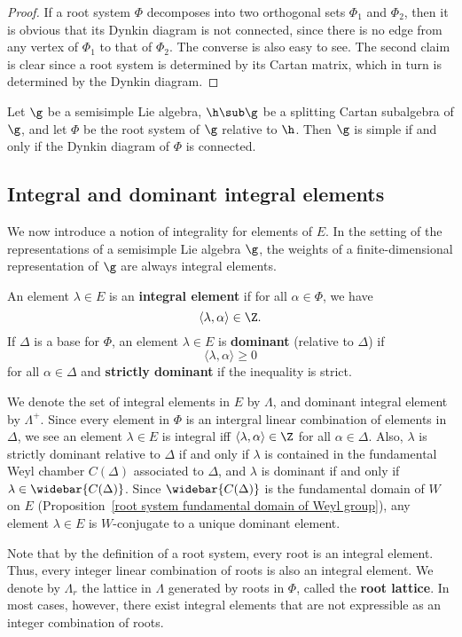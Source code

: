 \begin{proof}
If a root system $\Phi$ decomposes into two orthogonal sets $\Phi_1$ and $\Phi_2$, then it is obvious that its Dynkin diagram is not connected, since there is no edge from any vertex of $\Phi_1$ to that of $\Phi_2$. The converse is also easy to see. The second claim is clear since a root system is determined by its Cartan matrix, which in turn is determined by the Dynkin diagram.
\end{proof}
\begin{corollary}
Let $\g$ be a semisimple Lie algebra, $\h\sub\g$ be a splitting Cartan subalgebra of $\g$, and let $\Phi$ be the root system of $\g$ relative to $\h$. Then $\g$ is simple if and only if the Dynkin diagram of $\Phi$ is connected.
\end{corollary} 
\subsection{Integral and dominant integral elements}
We now introduce a notion of integrality for elements of $E$. In the setting of the representations of a semisimple Lie algebra $\g$, the weights of a finite-dimensional representation of $\g$ are always integral elements.
\begin{definition}
An element $\lambda\in E$ is an \textbf{integral element} if for all $\alpha\in\Phi$, we have
\[\langle\lambda,\alpha\rangle\in\Z.\]
If $\Delta$ is a base for $\Phi$, an element $\lambda\in E$ is \textbf{dominant} (relative to $\Delta$) if
\[\langle\lambda,\alpha\rangle\geq 0\]
for all $\alpha\in\Delta$ and \textbf{strictly dominant} if the inequality is strict.
\end{definition}
We denote the set of integral elements in $E$ by $\Lambda$, and dominant integral element by $\Lambda^+$. Since every element in $\Phi$ is an intergral linear combination of elements in $\Delta$, we see an element $\lambda\in E$ is integral iff $\langle\lambda,\alpha\rangle\in\Z$ for all $\alpha\in\Delta$. Also, $\lambda$ is strictly dominant relative to $\Delta$ if and only if $\lambda$ is contained in the fundamental Weyl chamber $C(\Delta)$ associated to $\Delta$, and $\lambda$ is dominant if and only if $\lambda\in\widebar{C(\Delta)}$. Since $\widebar{C(\Delta)}$ is the fundamental domain of $W$ on $E$ (Proposition~\ref{root system fundamental domain of Weyl group}), any element $\lambda\in E$ is $W$-conjugate to a unique dominant element.\par
Note that by the definition of a root system, every root is an integral element. Thus, every integer linear combination of roots is also an integral element. We denote by $\Lambda_r$ the lattice in $\Lambda$ generated by roots in $\Phi$, called the \textbf{root lattice}. In most cases, however, there exist integral elements that are not expressible as an integer combination of roots.
